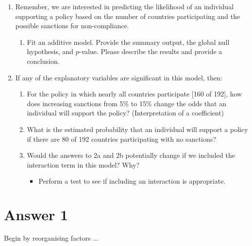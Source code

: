 \documentclass[12pt,letterpaper]{article}
\begin{document}
\begin{enumerate}
	\item
	Remember, we are interested in predicting the likelihood of an individual supporting a policy based on the number of countries participating and the possible sanctions for non-compliance.
	\begin{enumerate}
		\item [] Fit an additive model. Provide the summary output, the global null hypothesis, and $p$-value. Please describe the results and provide a conclusion.
	\end{enumerate}
	
	\item
	If any of the explanatory variables are significant in this model, then:
	\begin{enumerate}
		\item
		For the policy in which nearly all countries participate [160 of 192], how does increasing sanctions from 5\% to 15\% change the odds that an individual will support the policy? (Interpretation of a coefficient)
		\item
		What is the estimated probability that an individual will support a policy if there are 80 of 192 countries participating with no sanctions? 
		\item
		Would the answers to 2a and 2b potentially change if we included the interaction term in this model? Why? 
		\begin{itemize}
			\item Perform a test to see if including an interaction is appropriate.
		\end{itemize}
	\end{enumerate}
	\end{enumerate}

\newpage

\section*{Answer 1} 
\vspace{.25cm}

Begin by reorganising factors ...
\end{document}
